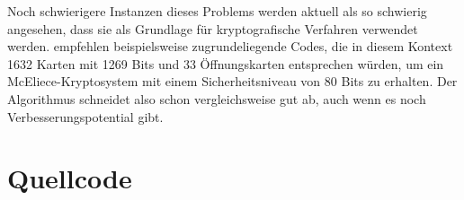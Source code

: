 \documentclass[a4paper,10pt,ngerman]{scrartcl}
\begin{document}
Noch schwierigere Instanzen dieses Problems werden aktuell als so schwierig angesehen, dass sie als Grundlage für kryptografische Verfahren verwendet werden. \citeauthor{bernsteinAttackingDefendingMcEliece2008} empfehlen beispielsweise zugrundeliegende Codes, die in diesem Kontext 1632 Karten mit 1269 Bits und 33 Öffnungskarten entsprechen würden, um ein McEliece-Kryptosystem mit einem Sicherheitsniveau von 80 Bits zu erhalten. \cite{bernsteinAttackingDefendingMcEliece2008}
Der Algorithmus schneidet also schon vergleichsweise gut ab, auch wenn es noch Verbesserungspotential gibt.

\section{Quellcode}









 
\printbibliography[heading=bibintoc]
\end{document}
